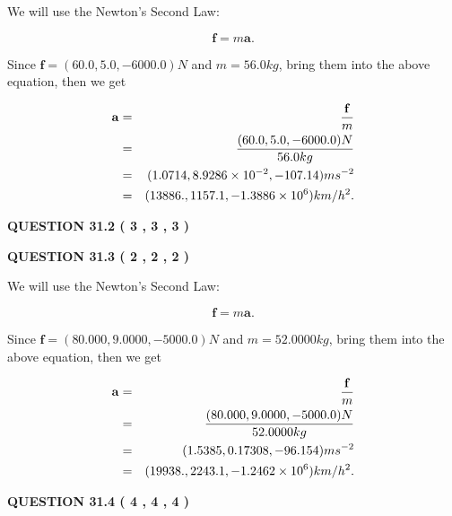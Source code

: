 \documentclass[12pt]{article}
\begin{document}
  
 
 

We will use the Newton's Second Law:
 
\[
\mathbf{f}=m\mathbf{a}.
\]
 
Since $\mathbf{f}=( %
60.0,  %
5.0,  %
-6000.0 )N$
and $m= %
56.0 kg$, bring them into the above equation, then we get
 
\begin{eqnarray*}
\mathbf{a}&=&\frac{\mathbf{f}}m  \\
&=&\frac{(
60.0 ,
5.0 ,
-6000.0 )N
}{ %
56.0 kg}  \\
&=&(
1.0714 ,
8.9286 \times 10^{-2},
-107.14
)ms^{-2} \\
&=&(
13886. ,
1157.1 ,
-1.3886 \times 10^{6}
)km/h^2.
\end{eqnarray*}
 
 
 
  
\vspace{0.2in}
  
{\textbf{\Large{QUESTION
31.2 
 (           3 ,           3 ,           3 )
}}}
  
  
  
\vspace{0.2in}
  
{\textbf{\Large{QUESTION
31.3 
 (           2 ,           2 ,           2 )
}}}
  
  
 
 

We will use the Newton's Second Law:
 
\[
\mathbf{f}=m\mathbf{a}.
\]
 
Since $\mathbf{f}=( %
80.000,  %
9.0000,  %
-5000.0 )N$
and $m= %
52.0000kg$, bring them into the above equation, then we get
 
\begin{eqnarray*}
\mathbf{a}&=&\frac{\mathbf{f}}m  \\
&=&\frac{(
80.000 ,
9.0000 ,
-5000.0 )N
}{ %
52.0000 kg}  \\
&=&(
1.5385 ,
0.17308,
-96.154
)ms^{-2} \\
&=&(
19938. ,
2243.1 ,
-1.2462 \times 10^{6}
)km/h^2.
\end{eqnarray*}
 
 
 
  
\vspace{0.2in}
  
{\textbf{\Large{QUESTION
31.4 
 (           4 ,           4 ,           4 )
}}}
  
  
  
\end{document}
